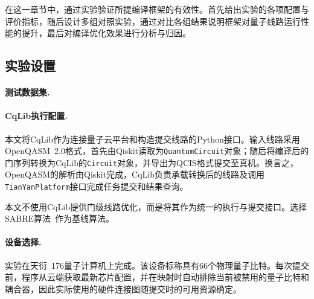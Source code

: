在这一章节中，\ourwork 通过实验验证所提编译框架的有效性。首先给出实验的各项配置与评价指标，随后设计多组对照实验，通过对比各组结果说明框架对量子线路运行性能的提升，最后对编译优化效果进行分析与归因。

\subsection{实验设置}
\label{sec:experiment-setup}

\paragraph{测试数据集.} 

\paragraph{CqLib执行配置.}
本文将CqLib作为连接量子云平台和构造提交线路的Python接口。输入线路采用OpenQASM~2.0格式，首先由Qiskit读取为\texttt{QuantumCircuit}对象；随后将编译后的门序列转换为CqLib的\texttt{Circuit}对象，并导出为QCIS格式提交至真机。换言之，OpenQASM的解析由Qiskit完成，CqLib负责承载转换后的线路及调用\texttt{TianYanPlatform}接口完成任务提交和结果查询。

本文不使用CqLib提供门级线路优化，而是将其作为统一的执行与提交接口。\ourwork 选择SABRE算法~\cite{li2019tackling}作为基线算法。

\paragraph{设备选择.}
实验在天衍~176量子计算机上完成。该设备标称具有66个物理量子比特。每次提交前，程序从云端获取最新芯片配置，并在映射时自动排除当前被禁用的量子比特和耦合器，因此实际使用的硬件连接图随提交时的可用资源确定。

